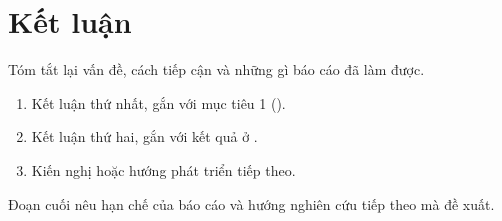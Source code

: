 \chapter{Kết luận}
\label{chap:ket-luan}

Tóm tắt lại vấn đề, cách tiếp cận và những gì báo cáo đã làm được.

\begin{ketqua}
  \begin{enumerate}
    \item Kết luận thứ nhất, gắn với mục tiêu 1 ().
    \item Kết luận thứ hai, gắn với kết quả ở .
    \item Kiến nghị hoặc hướng phát triển tiếp theo.
  \end{enumerate}
\end{ketqua}

Đoạn cuối nêu hạn chế của báo cáo và hướng nghiên cứu tiếp theo mà \nhom{} đề xuất.
